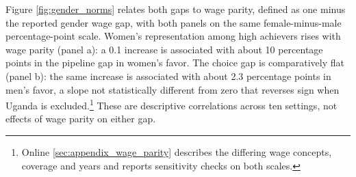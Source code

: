 Figure \ref{fig:gender_norms} relates both gaps to wage parity, defined as one minus the reported gender wage gap, with both panels on the same female-minus-male percentage-point scale. Women's representation among high achievers rises with wage parity (panel a): a 0.1 increase is associated with about 10 percentage points in the pipeline gap in women's favor. The choice gap is comparatively flat (panel b): the same increase is associated with about 2.3 percentage points in men's favor, a slope not statistically different from zero that reverses sign when Uganda is excluded.\footnote{Online \ref{sec:appendix_wage_parity} describes the differing wage concepts, coverage and years and reports sensitivity checks on both scales.} These are descriptive correlations across ten settings, not effects of wage parity on either gap.

